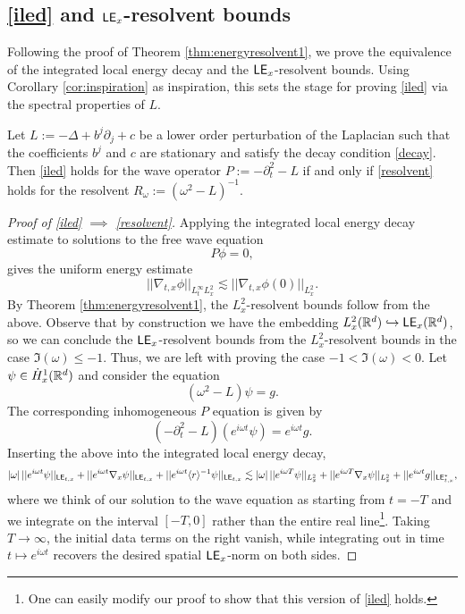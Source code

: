 \subsection{\eqref{iled} and $\mathsf{LE}_x$-resolvent bounds}
	
Following the proof of Theorem \ref{thm:energyresolvent1}, we prove the equivalence of the integrated local energy decay and the $\mathsf{LE}_x$-resolvent bounds. Using Corollary \ref{cor:inspiration} as inspiration, this sets the stage for proving \eqref{iled} via the spectral properties of $L$. 
	
\begin{theorem}
	Let $L := - \Delta + b^j \partial_j + c$ be a lower order perturbation of the Laplacian such that the coefficients $b^j$ and $c$ are stationary and satisfy the decay condition \eqref{decay}. Then \eqref{iled} holds for the wave operator $P := - \partial_t^2 - L$ if and only if \eqref{resolvent} holds for the resolvent $R_\omega := (\omega^2 - L)^{-1}$. 
\end{theorem}

\begin{proof}[Proof of \eqref{iled} $\implies$ \eqref{resolvent}]
	Applying the integrated local energy decay estimate to solutions to the free wave equation
		\[ 
			P \phi = 0,
		\]
	gives the uniform energy estimate 
		\[
			||\nabla_{t, x} \phi||_{L^\infty_t L^2_x} \lesssim ||\nabla_{t, x} \phi (0)||_{L^2_x}.
		\]
	By Theorem \ref{thm:energyresolvent1}, the $L^2_x$-resolvent bounds follow from the above. Observe that by construction we have the embedding $L^2_x (\mathbb R^d)\hookrightarrow \mathsf{LE}_x (\mathbb R^d)$, so we can conclude the $\mathsf{LE}_x$-resolvent bounds from the $L^2_x$-resolvent bounds in the case $\Im(\omega) \leq -1$. Thus, we are left with proving the case $-1 < \Im(\omega) < 0$. Let $\psi \in \dot H^1_x (\mathbb R^d)$ and consider the equation
		\[
			(\omega^2 - L) \psi = g. 
		\]
	The corresponding inhomogeneous $P$ equation is given by 
		\[
			(- \partial_t^2 - L)(e^{i \omega t} \psi) = e^{i \omega t} g. 
		\]
	Inserting the above into the integrated local energy decay,
		\[
			|\omega| \, ||e^{i \omega t} \psi||_{\mathsf{LE}_{t, x}} + || e^{i \omega t} \nabla_x \psi||_{\mathsf{LE}_{t, x}} + ||  e^{i \omega t} \langle r \rangle^{-1}\psi ||_{\mathsf{LE}_{t, x}} \lesssim |\omega| \, ||e^{i \omega T}\psi||_{L^2_x} + || e^{i \omega T} \nabla_x \psi||_{L^2_x} + ||e^{i \omega t} g ||_{\mathsf{LE}_{t, x}^*},
		\]
	where we think of our solution to the wave equation as starting from $t = - T$ and we integrate on the interval $[-T, 0]$	rather than the entire real line\footnote{One can easily modify our proof to show that this version of \eqref{iled} holds.}. Taking $T \to \infty$, the initial data terms on the right vanish, while integrating out in time $t \mapsto e^{i \omega t}$ recovers the desired spatial $\mathsf{LE}_x$-norm on both sides.
\end{proof}

